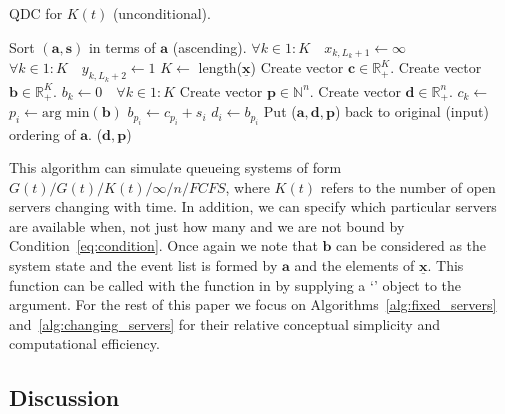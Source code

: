 \documentclass[article]{jss}
\begin{document}
\begin{algorithm}[t!]
\caption{QDC for $K(t)$ (unconditional).}
\label{alg:changing_servers_unconditional} 
\begin{algorithmic}[1]
\State Sort $(\mathbf{a}, \mathbf{s})$ in terms of $\mathbf{a}$ (ascending).
\State $\forall k \in 1:K \quad x_{k,L_k+1} \leftarrow \infty$
\State $\forall k \in 1:K \quad y_{k,L_k+2} \leftarrow 1$
\State $K \leftarrow $ length($\mathbf{\underline{x}}$)
\State Create vector $\mathbf{c} \in \mathbb{R}_{\text{+}}^{K}$.
\State Create vector $\mathbf{b} \in \mathbb{R}_{\text{+}}^{K}$.
\State $b_k \leftarrow 0 \quad \forall k \in 1:K$
\State Create vector $\mathbf{p} \in \mathbb{N}^{n}$.
\State Create vector $\mathbf{d} \in \mathbb{R}_{+}^{n}$.
        \State $c_k \leftarrow$ 
    \EndFor
\State $p_i \leftarrow \text{arg min}(\mathbf{b}) $
\State $b_{p_i} \leftarrow c_{p_i} + s_i $
\State $d_i \leftarrow b_{p_i}$ 
\EndFor 
\State Put ($\mathbf{a}, \mathbf{d}, \mathbf{p}$) back to original (input) ordering of $\mathbf{a}$.
\State \Return ($\mathbf{d}, \mathbf{p}$)
\EndFunction
\end{algorithmic}
\end{algorithm}

This algorithm can simulate queueing systems of form
$G(t)/G(t)/K(t)/\infty/n/\mathit{FCFS}$, where $K(t)$ refers to the
number of open servers changing with time. In addition, we can specify
which particular servers are available when, not just how many and we
are not bound by Condition~\ref{eq:condition}. Once again we note that
$\mathbf{b}$ can be considered as the system state and the event list
is formed by $\mathbf{a}$ and the elements of
$\mathbf{\underline{x}}$. This function can be called with the
 function in  by supplying a
`' object to the  argument. For the rest
of this paper we focus on Algorithms~\ref{alg:fixed_servers}
and~\ref{alg:changing_servers} for their relative conceptual
simplicity and computational efficiency.

\subsection{Discussion}
\end{document}
